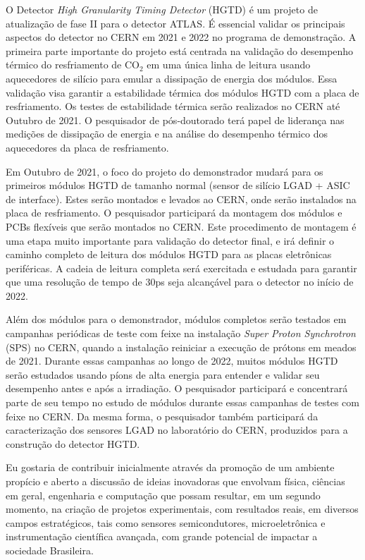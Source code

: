 O Detector \textit{High Granularity Timing Detector} (HGTD) é um projeto de atualização de fase II para o detector ATLAS. É essencial validar os principais aspectos do detector no CERN em 2021 e 2022 no programa de demonstração. A primeira parte importante do projeto está centrada na validação do desempenho térmico do resfriamento de CO$_{2}$ em uma única linha de leitura usando aquecedores de silício para emular a dissipação de energia dos módulos. Essa validação visa garantir a estabilidade térmica dos módulos HGTD com a placa de resfriamento. Os testes de estabilidade térmica serão realizados no CERN até Outubro de 2021. O pesquisador de pós-doutorado terá papel de liderança nas medições de dissipação de energia e na análise do desempenho térmico dos aquecedores da placa de resfriamento.

Em Outubro de 2021, o foco do projeto do demonstrador mudará para os primeiros módulos HGTD de tamanho normal (sensor de silício LGAD + ASIC de interface). Estes serão montados e levados ao CERN, onde serão instalados na placa de resfriamento. O pesquisador participará da montagem dos módulos e PCBs flexíveis que serão montados no CERN. Este procedimento de montagem é uma etapa muito importante para validação do detector final, e irá definir o caminho completo de leitura dos módulos HGTD para as placas eletrônicas periféricas. A cadeia de leitura completa será exercitada e estudada para garantir que uma resolução de tempo de 30ps seja alcançável para o detector no início de 2022.

Além dos módulos para o demonstrador, módulos completos serão testados em campanhas periódicas de teste com feixe na instalação \textit{Super Proton Synchrotron} (SPS) no CERN, quando a instalação reiniciar a execução de prótons em meados de 2021. Durante essas campanhas ao longo de 2022, muitos módulos HGTD serão estudados usando píons de alta energia para entender e validar seu desempenho antes e após a irradiação. O pesquisador participará e concentrará parte de seu tempo no estudo de módulos durante essas campanhas de testes com feixe no CERN. Da mesma forma, o pesquisador também participará da caracterização dos sensores LGAD no laboratório do CERN, produzidos para a construção do detector HGTD. 


Eu gostaria de contribuir inicialmente através da promoção de um ambiente propício e aberto a discussão de ideias inovadoras que envolvam física, ciências em geral, engenharia e computação que possam resultar, em um segundo momento, na criação de projetos experimentais, com resultados reais, em diversos campos estratégicos, tais como sensores semicondutores, microeletrônica e instrumentação científica avançada, com grande potencial de impactar a sociedade Brasileira.

